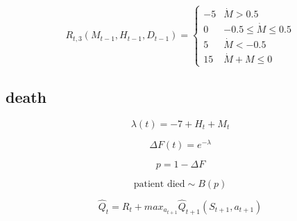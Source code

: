 \documentclass[12pt]{article}
\begin{document}
\[
R_{t, 3}(M_{t-1}, H_{t-1}, D_{t-1}) = 
\begin{cases}
  -5 & \dot{M} > 0.5 \\
  0 & -0.5 \leq \dot{M} \leq 0.5 \\
  5 & \dot{M} < -0.5 \\
  15 & \dot{M} + M \leq 0
\end{cases}
\]


\subsection{death} %
\label{sub:death}

\[
\lambda(t) = -7 + H_{t} + M_{t}
\]

\[
\Delta F(t) = e^{-\lambda}
\]

\[
p = 1 - \Delta F
\]

\[
\text{patient died} \sim B(p)
\]



\[
\hat{Q}_{t} = R_{t} + max_{a_{t + 1}} \hat{Q}_{t+1}(S_{t+1}, a_{t+1})
\]
\end{document}
